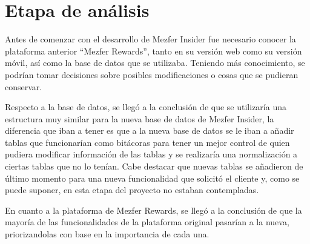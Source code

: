 \section{Etapa de análisis}
Antes de comenzar con el desarrollo de Mezfer Insider fue necesario conocer la plataforma anterior ``Mezfer Rewards'', tanto en su versión web como su versión móvil, así como la base de datos que se utilizaba. Teniendo más conocimiento, se podrían tomar decisiones sobre posibles modificaciones o cosas que se pudieran conservar.

Respecto a la base de datos, se llegó a la conclusión de que se utilizaría una estructura muy similar para la nueva base de datos de Mezfer Insider, la diferencia que iban a tener es que a la nueva base de datos se le iban a añadir tablas que funcionarían como bitácoras para tener un mejor control de quien pudiera modificar información de las tablas y se realizaría una normalización a ciertas tablas que no lo tenían. Cabe destacar que nuevas tablas se añadieron de último momento para una nueva funcionalidad que solicitó el cliente y, como se puede suponer, en esta etapa del proyecto no estaban contempladas.

En cuanto a la plataforma de Mezfer Rewards, se llegó a la conclusión de que la mayoría de las funcionalidades de la plataforma original pasarían a la nueva, priorizandolas con base en la importancia de cada una.